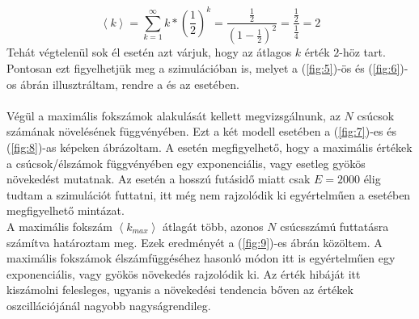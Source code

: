 \begin{equation}
    \left< k \right>
    =
    \sum_{k = 1}^{\infty} k * \left( \frac{1}{2} \right)^{k}
    =
    \frac{\frac{1}{2}}{(1 - \frac{1}{2})^2}
    =
    \frac{\frac{1}{2}}{\frac{1}{4}}
    =
    2
\end{equation}
Tehát végtelenül sok él esetén azt várjuk, hogy az átlagos $k$ érték $2$-höz tart. Pontosan ezt figyelhetjük meg a szimulációban is, melyet a (\ref{fig:5})-ös és (\ref{fig:6})-os ábrán illusztráltam, rendre a \rrt és az \apm esetében.
\\ \\
Végül a maximális fokszámok alakulását kellett megvizsgálnunk, az $N$ csúcsok számának növelésének függvényében. Ezt a két modell esetében a (\ref{fig:7})-es és (\ref{fig:8})-as képeken ábrázoltam. A \rrt esetén megfigyelhető, hogy a maximális értékek a csúcsok/élszámok függvényében egy exponenciális, vagy esetleg gyökös növekedést mutatnak. Az \apm esetén a hosszú futásidő miatt csak $E=2000$ élig tudtam a szimulációt futtatni, itt még nem rajzolódik ki egyértelműen a \rrt esetében megfigyelhető mintázat.\\
A maximális fokszám $\left< k_{max} \right>$ átlagát több, azonos $N$ csúcsszámú futtatásra számítva határoztam meg. Ezek eredményét a (\ref{fig:9})-es ábrán közöltem. A maximális fokszámok élszámfüggéséhez hasonló módon itt is egyértelműen egy exponenciális, vagy gyökös növekedés rajzolódik ki. Az érték hibáját itt kiszámolni felesleges, ugyanis a növekedési tendencia bőven az értékek oszcillációjánál nagyobb nagyságrendileg.